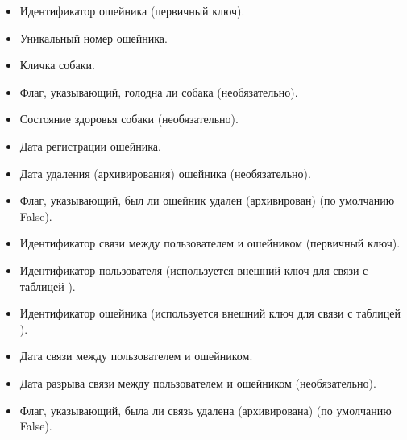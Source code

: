 \documentclass[letterpaper,10pt,russian]{sphinxmanual}
\begin{document}
\sphinxAtStartPar
{}
\begin{itemize}
\item {} 
\sphinxAtStartPar
{}  Идентификатор ошейника (первичный ключ).

\item {} 
\sphinxAtStartPar
{}  Уникальный номер ошейника.

\item {} 
\sphinxAtStartPar
{}  Кличка собаки.

\item {} 
\sphinxAtStartPar
{}  Флаг, указывающий, голодна ли собака (необязательно).

\item {} 
\sphinxAtStartPar
{}  Состояние здоровья собаки (необязательно).

\item {} 
\sphinxAtStartPar
{}  Дата регистрации ошейника.

\item {} 
\sphinxAtStartPar
{}  Дата удаления (архивирования) ошейника (необязательно).

\item {} 
\sphinxAtStartPar
{}  Флаг, указывающий, был ли ошейник удален (архивирован) (по умолчанию False).

\end{itemize}

\sphinxAtStartPar
{}
\begin{itemize}
\item {} 
\sphinxAtStartPar
{}  Идентификатор связи между пользователем и ошейником (первичный ключ).

\item {} 
\sphinxAtStartPar
{}  Идентификатор пользователя (используется внешний ключ для связи с таблицей ).

\item {} 
\sphinxAtStartPar
{}  Идентификатор ошейника (используется внешний ключ для связи с таблицей ).

\item {} 
\sphinxAtStartPar
{}  Дата связи между пользователем и ошейником.

\item {} 
\sphinxAtStartPar
{}  Дата разрыва связи между пользователем и ошейником (необязательно).

\item {} 
\sphinxAtStartPar
{}  Флаг, указывающий, была ли связь удалена (архивирована) (по умолчанию False).

\end{itemize}
\end{document}
